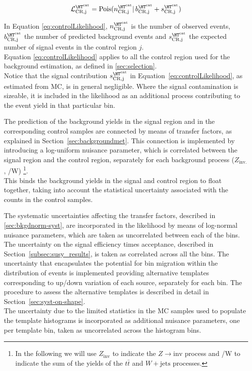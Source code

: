 \begin{equation}
\mathcal{L}^{\htcat}_{\mathrm{CR,j}}=\mathrm{Pois}(n^{\htcat}_{\mathrm{CR,j}} |\, b^{\htcat}_{\mathrm{CR,j}} + s^{\htcat}_{\mathrm{CR,j}})
\label{eq:controlLikelihood}
\end{equation}

In Equation \ref{eq:controlLikelihood}, $n^{\htcat}_{\mathrm{CR,j}}$ is the number of observed events, $b^{\htcat}_{\mathrm{CR,j}}$ the number of predicted 
background events and $s^{\htcat}_{\mathrm{CR,j}}$ the expected number of signal events in the control region $j$. \\
Equation \ref{eq:controlLikelihood} applies to all the control region used for the background estimation, 
as defined in \ref{sec:selection}. \\
Notice that the signal contribution $s^{\htcat}_{\mathrm{CR,j}}$ in Equation~\ref{eq:controlLikelihood}, as estimated from MC, is in general negligible. 
Where the signal contamination is sizeable, it is included in the likelihood as an additional process contributing to the event yield in that particular bin.

The prediction of the background yields in the signal region and in the corresponding control samples are connected 
by means of transfer factors, as explained in Section~\ref{sec:backgroundmet}. 
This connection is implemented by introducing a log-uniform nuisance parameter, which is correlated 
between the signal region and the control region, separately for each background process ($Z_{\mathrm{inv.}}$, \ttbar/W) \footnote{In the following we will use $Z_{\mathrm{inv}}$ to indicate the $Z\to \mathrm{inv}$ process and \ttbar/W to indicate the sum of the yields of the $t\bar{t}$ and $W+\mathrm{jets}$ processes.}. \\
This binds the background yields in the signal and control region to float together, 
taking into account the statistical uncertainty associated with the counts in the control samples. 

The systematic uncertainties affecting the transfer factors, described in \ref{sec:bkgdnorm-syst}, 
are incorporated in the likelihood by means of log-normal nuisance parameters, 
which are taken as uncorrelated between each of the \htcat bins.
The uncertainty on the signal efficiency times acceptance, described in Section~\ref{subsec:susy_results}, is taken as correlated across all the \htcat bins. 
The uncertainty that encapsulates the potential for bin migration within the \mht distribution of events is implemented providing alternative templates corresponding to up/down variation of each source, separately for each \htcat bin. The procedure to assess the alternative templates is described in detail in Section~\ref{sec:syst-on-shape}. \\
The uncertainty due to the limited statistics in the MC samples used to populate the template histograms is incorporated 
as additional nuisance parameters, one per template bin, taken as uncorrelated across the histogram bins. 

